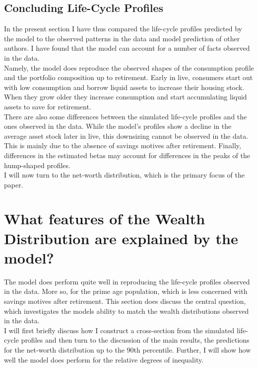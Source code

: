 \documentclass[12pt,a4paper,leqno]{article}
\theoremstyle{definition}
\begin{document}
\subsection{Concluding Life-Cycle Profiles}
In the present section I have thus compared the life-cycle profiles predicted by the model to the observed patterns in the data and model prediction of other authors. I have found that the model can account for a number of facts observed in the data. \\ Namely, the model does reproduce the observed shapes of the consumption profile and the portfolio composition up to retirement. Early in live, consumers start out with low consumption and borrow liquid assets to increase their housing stock. When they grow older they increase consumption and start accumulating liquid assets to save for retirement. \\
There are also some differences between the simulated life-cycle profiles and the ones observed in the data. While the model's profiles show a decline in the average asset stock later in live, this downsizing cannot be observed in the data. This is mainly due to the absence of savings motives after retirement. Finally, differences in the estimated betas may account for differences in the peaks of the hump-shaped profiles.\\ 
I will now turn to the net-worth distribution, which is the primary focus of the paper. 

\section{What features of the Wealth Distribution are explained by the model?}
\label{Chapter5}
The model does perform quite well in reproducing the life-cycle profiles observed in the data. More so, for the prime age population, which is less concerned with savings motives after retirement. This section does discuss the central question, which investigates the models ability to match the wealth distributions observed in the data.\\
I will first briefly discuss how I construct a cross-section from the simulated life-cycle profiles and then turn to the discussion of the main results, the predictions for the net-worth distribution up to the 90th percentile. Further, I will show how well the model does perform for the relative degrees of inequality. 
\end{document}
